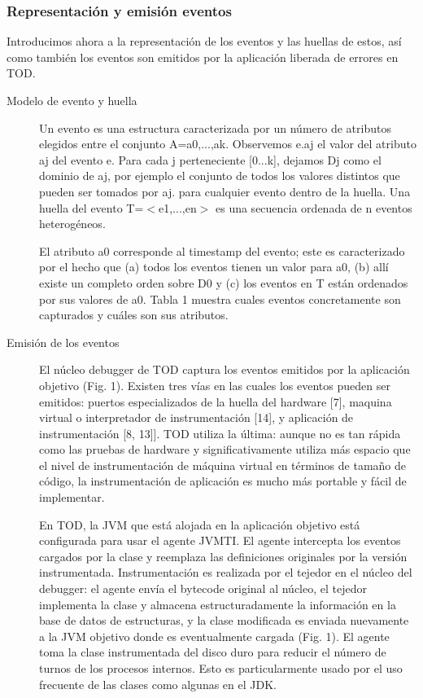 \documentclass[12pt,legalpaper]{report}
\begin{document}
			\subsubsection{Representación y emisión eventos}

Introducimos ahora a la representación de los eventos y las huellas de estos, así como también los eventos son emitidos por la aplicación liberada de errores en TOD.

\begin{description}

	\item[Modelo de evento y huella] Un evento es una estructura caracterizada por un número de atributos elegidos entre el conjunto A={a0,...,ak}.   Observemos e.aj el valor del atributo aj del evento e.  Para cada j perteneciente [0...k], dejamos Dj como el dominio de aj, por ejemplo el conjunto de todos los valores distintos que pueden ser tomados por aj. para cualquier evento dentro de la huella.  Una huella del evento T=$<$e1,...,en$>$ es una secuencia ordenada de n eventos heterogéneos.

El atributo a0 corresponde al timestamp del evento; este es caracterizado por el hecho que (a) todos los eventos tienen un valor para a0, (b) allí existe un completo orden sobre D0 y (c) los eventos en T están ordenados por sus valores de a0.  Tabla 1 muestra cuales eventos concretamente son capturados y cuáles son sus atributos.

	\item[Emisión de los eventos]  El núcleo debugger de TOD captura los eventos emitidos por la aplicación objetivo (Fig. 1).  Existen tres vías en las cuales los eventos pueden ser emitidos:  puertos especializados de la huella del hardware [7],  maquina virtual o interpretador de instrumentación [14], y aplicación de instrumentación [8, 13]].  TOD utiliza la última:  aunque no es tan rápida como las pruebas de hardware y significativamente utiliza más espacio que el nivel de instrumentación de máquina virtual en términos de tamaño de código, la instrumentación de aplicación es mucho más portable y fácil de implementar.

En TOD, la JVM que está alojada en la aplicación objetivo está configurada para usar el agente  JVMTI\footnotemark[1] .  El agente intercepta los eventos cargados por la clase y reemplaza las definiciones originales por la versión instrumentada.  Instrumentación es realizada por el tejedor en el núcleo del debugger:  el agente envía el bytecode original al núcleo,  el tejedor implementa la clase y almacena estructuradamente la información en la base de datos de estructuras, y la clase modificada es enviada nuevamente a la JVM objetivo donde es eventualmente cargada (Fig. 1).  El agente toma la clase instrumentada del disco duro para reducir el número de turnos de los procesos internos.  Esto es  particularmente usado por el uso frecuente de las clases como algunas en el JDK.


\end{description}
\end{document}

